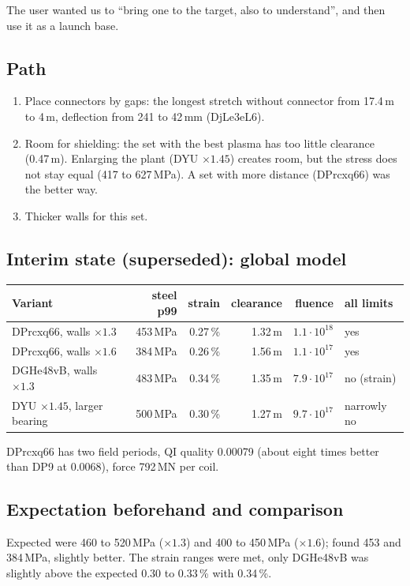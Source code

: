 The user wanted us to ``bring one to the target, also to understand'', and then use it as a launch base.

\subsection*{Path}
\begin{enumerate}\itemsep1pt
\item Place connectors by gaps: the longest stretch without connector from 17.4\,m to 4\,m, deflection from 241 to 42\,mm (DjLe3eL6).
\item Room for shielding: the set with the best plasma has too little clearance (0.47\,m). Enlarging the plant (DYU $\times1.45$) creates room, but the stress
  does not stay equal (417 to 627\,MPa). A set with more distance (DPrcxq66) was the better way.
\item Thicker walls for this set.
\end{enumerate}

\subsection*{Interim state (superseded): global model}
\begin{tabular}{lrrrrl}
\hline
Variant & steel p99 & strain & clearance & fluence & all limits \\ \hline
DPrcxq66, walls $\times1.3$ & 453\,MPa & 0.27\,\% & 1.32\,m & $1.1\cdot10^{18}$ & yes \\
DPrcxq66, walls $\times1.6$ & 384\,MPa & 0.26\,\% & 1.56\,m & $1.1\cdot10^{17}$ & yes \\
DGHe48vB, walls $\times1.3$ & 483\,MPa & 0.34\,\% & 1.35\,m & $7.9\cdot10^{17}$ & no (strain) \\
DYU $\times1.45$, larger bearing & 500\,MPa & 0.30\,\% & 1.27\,m & $9.7\cdot10^{17}$ & narrowly no \\ \hline
\end{tabular}

\smallskip
\noindent DPrcxq66 has two field periods, QI quality 0.00079 (about eight times better than DP9 at 0.0068), force 792\,MN per coil.

\subsection*{Expectation beforehand and comparison}
Expected were 460 to 520\,MPa ($\times1.3$) and 400 to 450\,MPa ($\times1.6$); found 453 and 384\,MPa, slightly better. The strain ranges were met,
only DGHe48vB was slightly above the expected 0.30 to 0.33\,\% with 0.34\,\%.

